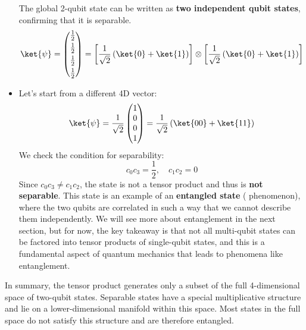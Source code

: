 \begin{itemize}
    The global 2-qubit state can be written as \textbf{two independent qubit states}, confirming that it is separable.
    \begin{equation*}
        \ket{\psi} = \begin{pmatrix}
            \frac{1}{2} \\[.3em]
            \frac{1}{2} \\[.3em]
            \frac{1}{2} \\[.3em]
            \frac{1}{2}
        \end{pmatrix}
        = \left[\frac{1}{\sqrt{2}} \left(\ket{0} + \ket{1}\right)\right] \otimes \left[\frac{1}{\sqrt{2}} \left(\ket{0} + \ket{1}\right)\right]
    \end{equation*}

    \item[\textcolor{Red2}{\faIcon{times}}] \label{ex:non-separable} Let's start from a different 4D vector:
    \begin{equation*}
        \ket{\psi} = \frac{1}{\sqrt{2}} \begin{pmatrix}
            1 \\
            0 \\
            0 \\
            1
        \end{pmatrix}
        = \frac{1}{\sqrt{2}} \left( \ket{00} + \ket{11} \right)
    \end{equation*}
    We check the condition for separability:
    \begin{equation*}
        c_{0}c_{3} = \frac{1}{2}, \quad c_{1}c_{2} = 0
    \end{equation*}
    Since $c_{0}c_{3} \neq c_{1}c_{2}$, the state is not a tensor product and thus is \textbf{not separable}. This state is an example of an \textbf{entangled state} ( phenomenon), where the two qubits are correlated in such a way that we cannot describe them independently. We will see more about entanglement in the next section, but for now, the key takeaway is that not all multi-qubit states can be factored into tensor products of single-qubit states, and this is a fundamental aspect of quantum mechanics that leads to phenomena like entanglement.
\end{itemize}
In summary, the tensor product generates only a subset of the full 4-dimensional space of two-qubit states. Separable states have a special multiplicative structure and lie on a lower-dimensional manifold within this space. Most states in the full space do not satisfy this structure and are therefore entangled.